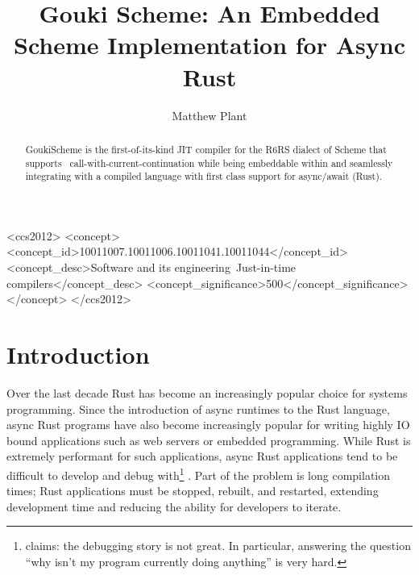 \documentclass[sigplan,review,anonymous]{acmart}
\begin{document}

\begin{CCSXML}
<ccs2012>
   <concept>
       <concept_id>10011007.10011006.10011041.10011044</concept_id>
       <concept_desc>Software and its engineering~Just-in-time compilers</concept_desc>
       <concept_significance>500</concept_significance>
       </concept>
 </ccs2012>
\end{CCSXML}


\title{Gouki Scheme: An Embedded Scheme Implementation for Async Rust}

\author{Matthew Plant}

\begin{abstract}

  GoukiScheme is the first-of-its-kind JIT compiler for the R6RS dialect of
  Scheme that supports \
  call-with-current-continuation while being embeddable
  within and seamlessly integrating with a compiled language with first class
  support for async/await (Rust).

\end{abstract}

\maketitle

\section{Introduction}

Over the last decade Rust has become an increasingly popular choice for systems
programming. Since the introduction of async runtimes to the Rust language,
async Rust programs have also become increasingly popular for writing highly
IO bound applications such as web servers or embedded programming. While Rust
is extremely performant for such applications\cite{embedded}, async Rust
applications tend to be difficult to develop and debug with\footnote{\citet{debugger} claims: the debugging story is not great. In particular, answering the question “why isn’t my program currently doing anything” is very hard.}
. Part of the problem
is long compilation times\cite{slow}; Rust applications must be stopped, rebuilt, and
restarted, extending development time and reducing the ability for developers to
iterate.
\end{document}
